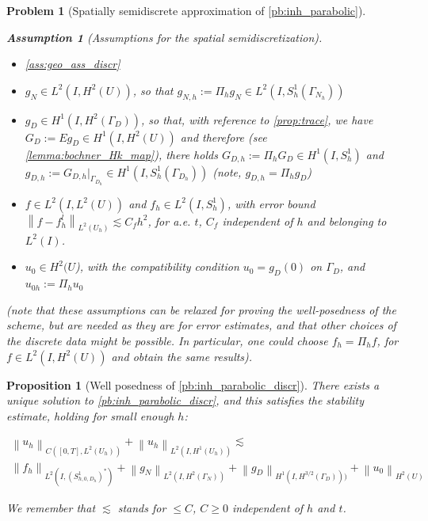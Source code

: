 \documentclass[english,a4paper,9pt,oneside]{scrbook}	%
\theoremstyle{break}
\newtheorem{prop}[equation]{Proposition}
\newtheorem{ass}[equation]{Assumption}
\newtheorem{pb}[equation]{Problem}
\theoremstyle{remark}
\newcommand{\norm}[1]{\left\lVert#1\right\rVert}
\begin{document}
\begin{appendices}
\begin{pb}[Spatially semidiscrete approximation of \cref{pb:inh_parabolic}]
\begin{ass}[Assumptions for the spatial semidiscretization]
\label{ass:discr_reg}
\textcolor{white}{ }
\begin{itemize}
	\item \cref{ass:geo_ass_discr}
	\item $g_N \in L^2(I,H^2(U))$, so that $g_{N,h}:=\Pi_h g_N \in L^2(I, S^1_h(\Gamma_{N_h}))$
	\item $g_D \in H^1(I, H^{2}(\Gamma_D))$, so that, with reference to \cref{prop:trace}, we have $G_D:=Eg_D \in H^1(I,H^2(U))$ and therefore (see \cref{lemma:bochner_Hk_map}), there holds $G_{D,h}:=\Pi_h G_D \in H^1(I, S^1_h)$ and $g_{D,h}:=G_{D,h}|_{\Gamma_{D_h}} \in H^1(I, S^1_h(\Gamma_{D_h}))$ (note, $g_{D,h} = \Pi_h g_D$)
	\item $f \in L^2(I,L^2(U))$ and $f_h \in L^2(I, S^1_h)$, with error bound  $\norm{f-f_h^l}_{L^2(U_h)}\lesssim C_f h^2$, for a.e. $t$, $C_f$ independent of $h$ and belonging to $L^2(I)$.
	\item $u_0\in H^2(U$), with the compatibility condition $u_{0} = g_{D}(0)$ on $\Gamma_{D}$, and $u_{0h}:=\Pi_h u_0$
\end{itemize}

(note that these assumptions can be relaxed for proving the well-posedness of the scheme, but are needed as they are for error estimates, and that other choices of the discrete data might be possible. In particular, one could choose $f_h=\Pi_h f$, for $f\in L^2(I, H^2(U))$ and obtain the same results).

\end{ass}

\end{pb}

\begin{prop}[Well posedness of \cref{pb:inh_parabolic_discr}]
\label{prop:wp_discr_par}
There exists a unique solution to \cref{pb:inh_parabolic_discr}, and this satisfies the stability estimate, holding for small enough $h$:

\begin{align*}
	\norm{u_h}_{C([0,T],L^2(U_h))} + \norm{u_h}_{L^2(I,H^1(U_h))}\lesssim \\\norm{f_h}_{L^2(I,(S^1_{h,0,D_h})^*)}  + \norm{g_{N}}_{L^2(I,H^2(\Gamma_{N}))} + \norm{g_D}_{H^1(I,H^{3/2}(\Gamma_D)))} + \norm{u_{0}}_{H^2(U)}
\end{align*}

We remember that $\lesssim$ stands for $\leq C$, $C\geq 0$ independent of $h$ and $t$.


\end{prop}
\end{appendices}
\end{document}
